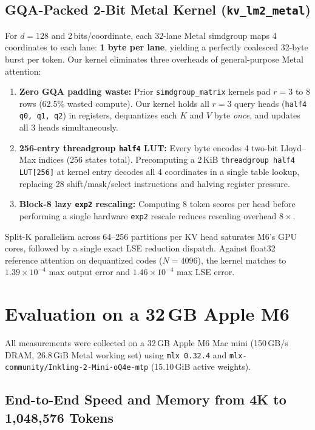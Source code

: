 \documentclass[conference]{IEEEtran}
\begin{document}
\subsection{GQA-Packed 2-Bit Metal Kernel (\texttt{kv\_lm2\_metal})}
For $d=128$ and 2\,bits/coordinate, each 32-lane Metal simdgroup maps 4 coordinates to each lane: \textbf{1 byte per lane}, yielding a perfectly coalesced 32-byte burst per token. Our kernel eliminates three overheads of general-purpose Metal attention:
\begin{enumerate}
    \item \textbf{Zero GQA padding waste:} Prior \texttt{simdgroup\_matrix} kernels pad $r=3$ to 8 rows (62.5\% wasted compute). Our kernel holds all $r=3$ query heads (\texttt{half4 q0, q1, q2}) in registers, dequantizes each $K$ and $V$ byte \emph{once}, and updates all 3 heads simultaneously.
    \item \textbf{256-entry threadgroup \texttt{half4} LUT:} Every byte encodes 4 two-bit Lloyd--Max indices (256 states total). Precomputing a 2\,KiB \texttt{threadgroup half4 LUT[256]} at kernel entry decodes all 4 coordinates in a single table lookup, replacing 28 shift/mask/select instructions and halving register pressure.
    \item \textbf{Block-8 lazy \texttt{exp2} rescaling:} Computing 8 token scores per head before performing a single hardware \texttt{exp2} rescale reduces rescaling overhead $8\times$.
\end{enumerate}
Split-K parallelism across 64--256 partitions per KV head saturates M6's GPU cores, followed by a single exact LSE reduction dispatch. Against float32 reference attention on dequantized codes ($N=4096$), the kernel matches to $1.39\times 10^{-4}$ max output error and $1.46\times 10^{-4}$ max LSE error.

\section{Evaluation on a 32\,GB Apple M6}
\label{sec:eval}

All measurements were collected on a 32\,GB Apple M6 Mac mini (150\,GB/s DRAM, 26.8\,GiB Metal working set) using \texttt{mlx 0.32.4} and \texttt{mlx-community/Inkling-2-Mini-oQ4e-mtp} (15.10\,GiB active weights).

\subsection{End-to-End Speed and Memory from 4K to 1{,}048{,}576 Tokens}
\end{document}
